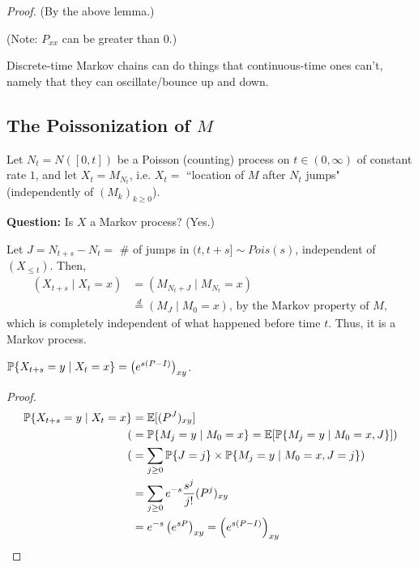 \documentclass[12pt]{article}
\begin{document}
\noindent\textit{Proof.} (By the above lemma.)

\noindent(Note: $P_{xx}$ can be greater than $0$.)

Discrete-time Markov chains can do things that continuous-time ones can't, namely that they can oscillate/bounce up and down.

\subsection*{The Poissonization of $M$}
\begin{exmp}[]

Let $N_t = N([0,t])$ be a Poisson (counting) process on $t\in(0,\infty)$ of constant rate $1$, and let $X_t=M_{N_t}$, i.e. $X_t=$ ``location of $M$ after $N_t$ jumps" (independently of $(M_k)_{k\geq 0}$).

\noindent\textbf{Question:} Is $X$ a Markov process? (Yes.)

\begin{sol} Let $J = N_{t+s} - N_t = $ \# of jumps in $(t, t+s] \sim Pois(s)$, independent of $(X_{\leq t})$. Then,
$$\begin{aligned}
	(X_{t+s} \mid X_t = x) &= (M_{N_t + J} \mid M_{N_t} = x)\\
	&\stackrel{d}{=} (M_J \mid M_0 = x) \text{, by the Markov property of } M,
\end{aligned}$$
which is completely independent of what happened before time $t$. Thus, it is a Markov process.
\end{sol}
\end{exmp}

\begin{coro} $\P\{X_{t+s}=y \mid X_t = x \} = \left( e^{s(P-I)} \right)_{xy}$.
\end{coro}

\begin{proof} 
$$\begin{aligned}
\P\{X_{t+s}=y \mid X_t = x \} &= \E[(P^J)_{xy}] \\
	( &= \P\{M_j=y \mid M_0=x \} = \E[\P\{M_j=y \mid M_0=x, J \}] ) \\
	( &= \sum_{j\geq0} \P\{J=j\} \times \P\{M_j=y \mid M_0=x, J=j\} ) \\
	&= \sum_{j\geq0} e^{-s} \frac{s^j}{j!} (P^j)_{xy} \\
	&= e^{-s}\left(e^{sP} \right)_{xy} = \left( e^{s(P-I)} \right)_{xy}
\end{aligned}$$
\end{proof}
\end{document}
